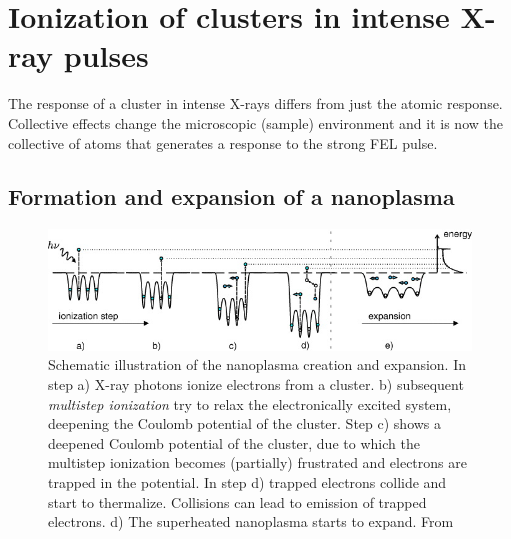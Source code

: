 \section{Ionization of clusters in intense X-ray pulses}\label{sec:ionizatin-of-ext-obj}
The response of a cluster in intense X-rays differs from just the atomic response. Collective effects change the microscopic (sample) environment and it is now the collective of atoms that generates a response to the strong FEL pulse.
\subsection{Formation and expansion of a nanoplasma}\label{sec:nanoplasma-expansion}
\begin{figure}
	\centering
		\includegraphics[width=1.00\textwidth]{images/nano-plasma-schematic.jpg}
	\caption[Schematic illustration of the nanoplasma creation and expansion.]{Schematic illustration of the nanoplasma creation and expansion. In step a) X-ray photons ionize electrons from a cluster. b) subsequent \textit{multistep ionization} try to relax the electronically excited system, deepening the Coulomb potential of the cluster. Step c) shows a deepened Coulomb potential of the cluster, due to which the multistep ionization becomes (partially) frustrated and electrons are trapped in the potential. In step d) trapped electrons collide and start to thermalize. Collisions can lead to emission of trapped electrons. d) The superheated nanoplasma starts to expand. From \citep[\href{https://creativecommons.org/licenses/by/3.0/}{\ccby}]{Arbeiter-2011-NJP}}
	\label{fig:nano-plasma-schematic}
\end{figure}
